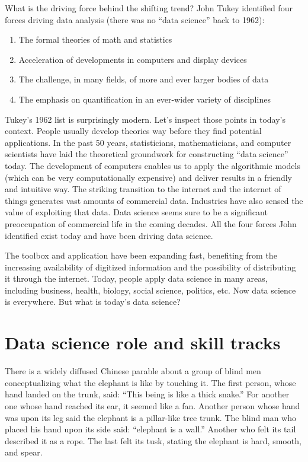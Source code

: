 \documentclass[12pt,]{krantz}
\providecommand{\tightlist}{%
  \setlength{\itemsep}{0pt}\setlength{\parskip}{0pt}}
\begin{document}
What is the driving force behind the shifting trend? John Tukey identified four forces driving data analysis (there was no ``data science'' back to 1962):

\begin{enumerate}
\def\labelenumi{\arabic{enumi}.}
\tightlist
\item
  The formal theories of math and statistics
\item
  Acceleration of developments in computers and display devices
\item
  The challenge, in many fields, of more and ever larger bodies of data
\item
  The emphasis on quantification in an ever-wider variety of disciplines
\end{enumerate}

Tukey's 1962 list is surprisingly modern. Let's inspect those points in today's context. People usually develop theories way before they find potential applications. In the past 50 years, statisticians, mathematicians, and computer scientists have laid the theoretical groundwork for constructing ``data science'' today. The development of computers enables us to apply the algorithmic models (which can be very computationally expensive) and deliver results in a friendly and intuitive way. The striking transition to the internet and the internet of things generates vast amounts of commercial data. Industries have also sensed the value of exploiting that data. Data science seems sure to be a significant preoccupation of commercial life in the coming decades. All the four forces John identified exist today and have been driving data science.

The toolbox and application have been expanding fast, benefiting from the increasing availability of digitized information and the possibility of distributing it through the internet. Today, people apply data science in many areas, including business, health, biology, social science, politics, etc. Now data science is everywhere. But what is today's data science?

\hypertarget{data-science-role-and-skill-tracks}{%
\section{Data science role and skill tracks}\label{data-science-role-and-skill-tracks}}

There is a widely diffused Chinese parable about a group of blind men conceptualizing what the elephant is like by touching it. The first person, whose hand landed on the trunk, said: ``This being is like a thick snake.'' For another one whose hand reached its ear, it seemed like a fan. Another person whose hand was upon its leg said the elephant is a pillar-like tree trunk. The blind man who placed his hand upon its side said: ``elephant is a wall.'' Another who felt its tail described it as a rope. The last felt its tusk, stating the elephant is hard, smooth, and spear.
\end{document}
